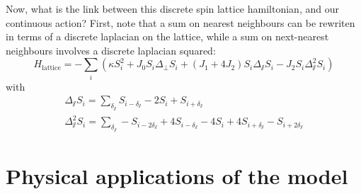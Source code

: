  Now, what is the link between this discrete spin lattice hamiltonian, and our continuous action?
First, note that a sum on nearest neighbours can be rewriten in terms of a discrete laplacian on the lattice, while a sum on next-nearest neighbours involves a discrete laplacian squared:
\begin{equation}
H_{\text{lattice}} = -\sum_i \left( \kappa S_i^2 + J_0 S_i \Delta_\perp S_i + (J_1 + 4 J_2) S_i \Delta_\sslash S_i - J_2 S_i \Delta_\sslash^2 S_i \right)
\end{equation}
with
\begin{align}
\Delta_\sslash S_i = \sum_{\delta_\sslash} S_{i-\delta_\sslash} - 2 S_i + S_{i+\delta_\sslash} \\
\Delta_\sslash^2 S_i = \sum_{\delta_\sslash} -S_{i-2\delta_\sslash} +  4 S_{i-\delta_\sslash} - 4 S_i + 4S_{i+\delta_\sslash} - S_{i+2\delta_\sslash}
\end{align}
\section{Physical applications of the model}

